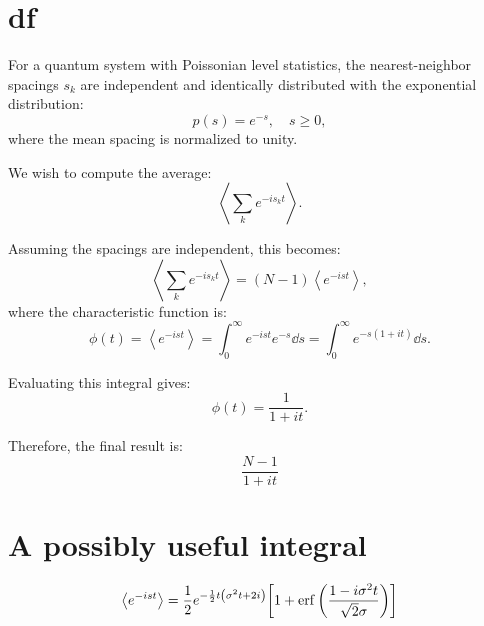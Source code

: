 \documentclass[10pt,a4paper]{article}
\begin{document}
\section{df}
For a quantum system with Poissonian level statistics, the nearest-neighbor spacings $s_k$ are independent and identically distributed with the exponential distribution:
\[
p(s) = e^{-s}, \quad s \geq 0,
\]
where the mean spacing is normalized to unity.

We wish to compute the average:
\[
\left\langle \sum_k e^{-i s_k t} \right\rangle.
\]

Assuming the spacings are independent, this becomes:
\[
\left\langle \sum_k e^{-i s_k t} \right\rangle = (N-1) \left\langle e^{-i s t} \right\rangle,
\]
where the characteristic function is:
\[
\phi(t) = \left\langle e^{-i s t} \right\rangle = \int_0^\infty e^{-i s t} e^{-s} \dd{s} = \int_0^\infty e^{-s(1 + i t)} \dd{s}.
\]

Evaluating this integral gives:
\[
\phi(t) = \frac{1}{1 + i t}.
\]

Therefore, the final result is:
\[
\boxed{\frac{N-1}{1+it}}
\]

\section{A possibly useful integral}
\begin{equation}
\expval{e^{-ist}} =
\frac{1}{2}
e^{-\frac{1}{2} t \left(\sigma ^2 t+2 i\right)} 
\qty[
1 + \erf\qty(\frac{1 - i\sigma^2 t}{\sqrt{2}\sigma})
]
\end{equation}



\printbibliography
\end{document}
